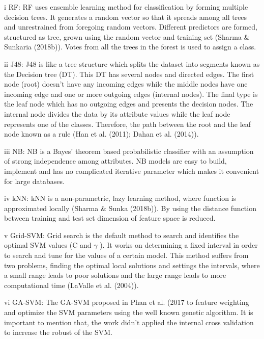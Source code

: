 i RF: RF uses ensemble learning method for classification by forming multiple decision trees. It generates a random vector so that it spreads among all trees and unrestrained from foregoing random vectors. Different predictors are formed, structured as tree, grown using the random vector and training set (Sharma \& Sunkaria (2018b)). Votes from all the trees in the forest is used to assign a class.

ii J48: J48 is like a tree structure which splits the dataset into segments known as the Decision tree (DT). This DT has several nodes and directed edges. The first node (root) doesn’t have any incoming edges while the middle nodes have one incoming edge and one or more outgoing edges (internal nodes). The final type is the leaf node which has no outgoing edges and presents the decision nodes. The internal node divides the data by its attribute values while the leaf node represents one of the classes. Therefore, the path between the root and the leaf node known as a rule (Han et al. (2011); Dahan et al. (2014)).

iii NB: NB is a Bayes’ theorem based probabilistic classifier with an assumption of strong independence among attributes. NB models are easy to build, implement and has no complicated iterative parameter which makes it convenient for large databases.

iv kNN: kNN is a non-parametric, lazy learning method, where function is approximated locally (Sharma \& Sunka (2018b)). By using the distance function between training and test set dimension of feature space is reduced.

v Grid-SVM: Grid search is the default method to search and identifies the optimal SVM values (C and $\gamma$ ). It works on determining a fixed interval in order to search and tune for the values of a certain model. This method suffers from two problems, finding the optimal local solutions and settings the intervals, where a small range leads to poor solutions and the large range leads to more computational time (LaValle et al. (2004)).

vi GA-SVM: The GA-SVM proposed in Phan et al. (2017 to feature weighting and optimize the SVM parameters using the well known genetic algorithm. It is important to mention that, the work didn’t applied the internal cross validation to increase the robust of the SVM.

